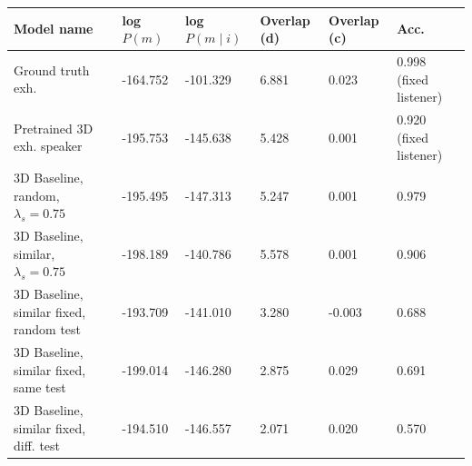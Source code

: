 \begin{table}[]
	\begin{tabularx}{\textwidth}{|X|l|l|X|X|X|}
		\hline
		\textbf{Model name}                                    & \textbf{log $P(m)$} & \textbf{log $P(m \mid i)$} & \textbf{Overlap (d)} & \textbf{Overlap (c)} & \textbf{Acc.} \\ \hline
		Ground truth exh.       &      -164.752            &         -101.329               &       6.881             &      0.023               &       0.998 (fixed listener)       \\ \hline
		Pretrained 3D exh. speaker                            &       -195.753            &         -145.638               &        5.428              &      0.001                & 0.920 (fixed listener)         \\ \hline
		3D Baseline, random, $\lambda_s = 0.75$  &       -195.495        &           -147.313           &          5.247            &         0.001             & 0.979               \\ \hline
		3D Baseline, similar, $\lambda_s = 0.75$ &      -198.189             &       -140.786                 &           5.578           &        0.001              &         0.906                        \\ \hline
		3D Baseline, similar fixed, random test &       -193.709            &    -141.010                  &        3.280            &      -0.003         &            0.688           \\ \hline
		3D Baseline, similar fixed, same test &      -199.014        &        -146.280           &        2.875       &      0.029   &     0.691                   \\ \hline
		3D Baseline, similar fixed, diff. test &     -194.510     &    -146.557          &   2.071      & 0.020    &     0.570          \\ \hline

\end{tabularx}
\end{table}
